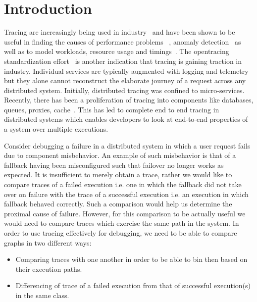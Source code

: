 \section{Introduction}
Tracing are increasingly being used in industry~\cite{Jaeger, Zipkin, 36356} and have been shown to be useful in finding the causes of performance problems~ \cite{36356, Fonseca:2007:XPN:1973430.1973450, Reynolds:2006:PDU:1267680.1267689, DBLP:conf/sigmetrics/ThereskaSSWALG06, Sambasivan:2011:DPC:1972457.1972463}, anomaly detection~\cite{Barham:2003:MOM:1251054.1251069, Chen:2004:PFE:1251175.1251198, 37477, Sambasivan:2011:DPC:1972457.1972463} as well as to model workloads, resource usage and timings~\cite{Mann:2011:MPE:2170444.2170464, Chanda:2007:WTP:1272996.1273001, 36356, DBLP:conf/sigmetrics/ThereskaSSWALG06, Barham:2003:MOM:1251054.1251069}.  The opentracing standardization effort~\cite{OpenTracing} is another indication that tracing is gaining traction in industry. Individual services are typically augmented with logging and telemetry but they alone cannot reconstruct the elaborate journey of a request across any distributed system. Initially, distributed tracing was confined to micro-services. Recently, there has been a proliferation of tracing into components like databases, queues, proxies, cache~\cite{OpenTracingCassandra, OpenTracingKafka, OpenTracingRedis}. This has led to complete end to end tracing in distributed systems which enables developers to look at end-to-end properties of a system over multiple executions. 

Consider debugging a failure in a distributed system in which a user request fails due to component misbehavior. An example of such misbehavior is that of a fallback having been misconfigured such that failover no longer works as expected. It is insufficient to merely obtain a trace, rather we would like to compare traces of a failed execution i.e. one in which the fallback did not take over on failure with the trace of a successful execution i.e. an execution in which fallback behaved correctly. Such a comparison would help us determine the proximal cause of failure. However, for this comparison to be actually useful we would need to compare traces which exercise the same path in the system.	
In order to use tracing effectively for debugging, we need to be able to compare graphs in two different ways:
\begin{itemize}
\item Comparing traces with one another in order to be able to bin then based on their execution paths.
\item Differencing of trace of a failed execution from that of successful execution(s) in the same class.
\end{itemize}

